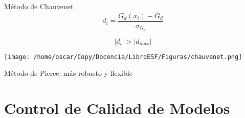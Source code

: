 \documentclass[xcolor={usenames,svgnames,dvipsnames}]{beamer}
\let\cite\parencite
\begin{document}
\begin{frame}[label=sec-3-11]{Método de Chauvenet}
\[
d_i = \frac{G_d(x_i) - \overline{G}_d}{\sigma_{G_d}}
\]

\[
\left| d_i \right| > \left| d_{max} \right|
\]

\begin{center}
\texttt{[image: /home/oscar/Copy/Docencia/LibroESF/Figuras/chauvenet.png]}
\end{center}

\begin{block}{Método de Pierce: más robusto y flexible \cite{Ross2003}}
\end{block}
\end{frame}
\section{Control de Calidad de Modelos}
\label{sec-4}
\end{document}
